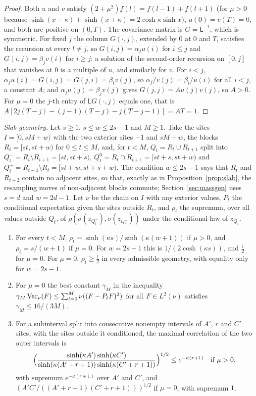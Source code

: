 \begin{proof}
Both $u$ and $v$ satisfy $(2+\mu^2)f(l)=f(l-1)+f(l+1)$ (for $\mu>0$ because
$\sinh(x-\kappa)+\sinh(x+\kappa)=2\cosh\kappa\sinh x$), $u(0)=v(T)=0$, and both
are positive on $(0,T)$. The covariance matrix is $G=\mathsf L^{-1}$, which is
symmetric. For fixed $j$ the column $G(\cdot,j)$, extended by $0$ at $0$ and
$T$, satisfies the recursion at every $l\ne j$, so $G(i,j)=\alpha_ju(i)$ for
$i\le j$ and $G(i,j)=\beta_jv(i)$ for $i\ge j$: a solution of the second-order
recursion on $[0,j]$ that vanishes at $0$ is a multiple of $u$, and similarly
for $v$. For $i<j$, $\alpha_ju(i)=G(i,j)=G(j,i)=\beta_iv(j)$, so $\alpha_j/v(j)
=\beta_i/u(i)$ for all $i<j$, a constant $A$; and $\alpha_ju(j)=\beta_jv(j)$
gives $G(j,j)=Au(j)v(j)$, so $A>0$. For $\mu=0$ the $j$-th entry of $\mathsf L
G(\cdot,j)$ equals one, that is $A[2j(T-j)-(j-1)(T-j)-j(T-j-1)]=AT=1$.
\end{proof}

\emph{Slab geometry.} Let $s\ge1$, $s\le w\le2s-1$ and $M\ge1$. Take the sites
$I=[0,sM+w)$ with the two exterior sites $-1$ and $sM+w$, the blocks
$R_t=[st,st+w)$ for $0\le t\le M$, and, for $t<M$, $Q_t=R_t\cup R_{t+1}$ split
into $Q_t^-=R_t\setminus R_{t+1}=[st,st+s)$, $Q_t^0=R_t\cap R_{t+1}=[st+s,
st+w)$ and $Q_t^+=R_{t+1}\setminus R_t=[st+w,st+s+w)$. The condition $w\le2s-1$
says that $R_t$ and $R_{t+2}$ contain no adjacent sites, so that, exactly as in
Proposition~\ref{prop:slab}, the resampling moves of non-adjacent blocks
commute; Section~\ref{sec:massgen} uses $s=d$ and $w=2d-1$. Let $\nu$ be the
chain on $I$ with any exterior values, $P_t$ the conditional expectation given
the sites outside $R_t$, and $\rho_t$ the supremum, over all values outside
$Q_t$, of $\rho(\sigma(z_{Q_t^-}),\sigma(z_{Q_t^+}))$ under the conditional law
of $z_{Q_t}$.

\begin{proposition}\label{prop:gausschain}
\leavevmode
\begin{enumerate}[label=\textup{(\roman*)},leftmargin=*]
\item For every $t<M$, $\rho_t=\sinh(\kappa s)/\sinh(\kappa(w+1))$ if $\mu>0$,
and $\rho_t=s/(w+1)$ if $\mu=0$. For $w=2s-1$ this is $1/(2\cosh(\kappa s))$,
and $\frac12$ for $\mu=0$. For $\mu=0$, $\rho_t\ge\frac12$ in every admissible
geometry, with equality only for $w=2s-1$.
\item For $\mu=0$ the best constant $\gamma_M$ in the inequality $\gamma_M
\operatorname{Var}_\nu(F)\le\sum_{t=0}^M\nu((F-P_tF)^2)$ for all $F\in L^2(\nu)$ satisfies
$\gamma_M\le16/(3M)$.
\item For a subinterval split into consecutive nonempty intervals of $A'$, $r$
and $C'$ sites, with the sites outside it conditioned, the maximal correlation
of the two outer intervals is
\[
\Bigl(\frac{\sinh(\kappa A')\sinh(\kappa C')}{\sinh(\kappa(A'+r+1))\sinh(\kappa(
C'+r+1))}\Bigr)^{1/2}\le e^{-\kappa(r+1)}\quad\text{if }\mu>0,
\]
with supremum $e^{-\kappa(r+1)}$ over $A'$ and $C'$, and $(A'C'/((A'+r+1)(C'+r
+1)))^{1/2}$ if $\mu=0$, with supremum $1$.
\end{enumerate}
\end{proposition}

